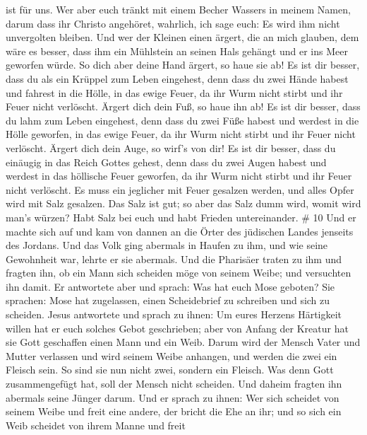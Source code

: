ist für uns.  Wer aber euch tränkt mit einem Becher Wassers
in meinem Namen, darum dass ihr Christo angehöret, wahrlich, ich sage
euch: Es wird ihm nicht unvergolten bleiben.  Und wer der
Kleinen einen ärgert, die an mich glauben, dem wäre es besser, dass ihm
ein Mühlstein an seinen Hals gehängt und er ins Meer geworfen würde.
 So dich aber deine Hand ärgert, so haue sie ab! Es ist dir
besser, dass du als ein Krüppel zum Leben eingehest, denn dass du zwei
Hände habest und fahrest in die Hölle, in das ewige Feuer, 
da ihr Wurm nicht stirbt und ihr Feuer nicht verlöscht. 
Ärgert dich dein Fuß, so haue ihn ab! Es ist dir besser, dass du lahm
zum Leben eingehest, denn dass du zwei Füße habest und werdest in die
Hölle geworfen, in das ewige Feuer,  da ihr Wurm nicht
stirbt und ihr Feuer nicht verlöscht.  Ärgert dich dein
Auge, so wirf's von dir! Es ist dir besser, dass du einäugig in das
Reich Gottes gehest, denn dass du zwei Augen habest und werdest in das
höllische Feuer geworfen,  da ihr Wurm nicht stirbt und ihr
Feuer nicht verlöscht.  Es muss ein jeglicher mit Feuer
gesalzen werden, und alles Opfer wird mit Salz gesalzen. 
Das Salz ist gut; so aber das Salz dumm wird, womit wird man's würzen?
Habt Salz bei euch und habt Frieden untereinander. \# 10 
Und er machte sich auf und kam von dannen an die Örter des jüdischen
Landes jenseits des Jordans. Und das Volk ging abermals in Haufen zu
ihm, und wie seine Gewohnheit war, lehrte er sie abermals. 
Und die Pharisäer traten zu ihm und fragten ihn, ob ein Mann sich
scheiden möge von seinem Weibe; und versuchten ihn damit. 
Er antwortete aber und sprach: Was hat euch Mose geboten? 
Sie sprachen: Mose hat zugelassen, einen Scheidebrief zu schreiben und
sich zu scheiden.  Jesus antwortete und sprach zu ihnen: Um
eures Herzens Härtigkeit willen hat er euch solches Gebot geschrieben;
 aber von Anfang der Kreatur hat sie Gott geschaffen einen
Mann und ein Weib.  Darum wird der Mensch Vater und Mutter
verlassen und wird seinem Weibe anhangen,  und werden die
zwei ein Fleisch sein. So sind sie nun nicht zwei, sondern ein Fleisch.
 Was denn Gott zusammengefügt hat, soll der Mensch nicht
scheiden.  Und daheim fragten ihn abermals seine Jünger
darum.  Und er sprach zu ihnen: Wer sich scheidet von
seinem Weibe und freit eine andere, der bricht die Ehe an ihr;
 und so sich ein Weib scheidet von ihrem Manne und freit
